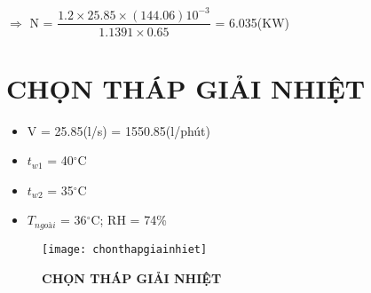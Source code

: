 $\Rightarrow$ N = $\dfrac{1.2 \times 25.85 \times (144.06)10^{-3}}{1.1391 \times 0.65}$ = 6.035(KW)
\section{CHỌN THÁP GIẢI NHIỆT}
\begin{itemize}
	\item V = 25.85(l/s) = 1550.85(l/phút)
	\item $t_{w1}$ = 40$^{\circ}$C
	\item $t_{w2}$ = 35$^{\circ}$C
	\item $T_{ngoài}$ = 36$^{\circ}$C; RH = 74\%
\end{itemize}

\begin{figure}[H]
	\centering
	\texttt{[image: chonthapgiainhiet]}
	\caption{\textbf{CHỌN THÁP GIẢI NHIỆT}}
\end{figure}